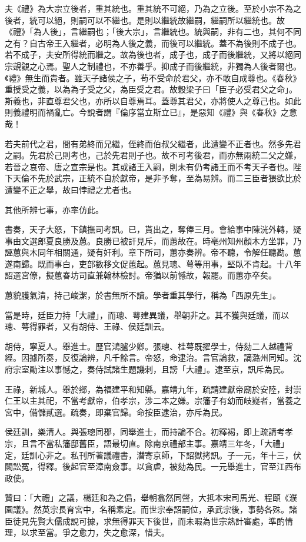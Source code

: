 \begin{pinyinscope}
夫《禮》為大宗立後者，重其統也。重其統不可絕，乃為之立後。至於小宗不為之後者，統可以絕，則嗣可以不繼也。是則以繼統故繼嗣，繼嗣所以繼統也。故《禮》「為人後」，言繼嗣也；「後大宗」，言繼統也。統與嗣，非有二也，其何不同之有？自古帝王入繼者，必明為人後之義，而後可以繼統。蓋不為後則不成子也。若不成子，夫安所得統而繼之。故為後也者，成子也，成子而後繼統，又將以絕同宗覬覦之心焉。聖人之制禮也，不亦善乎。抑成子而後繼統，非獨為人後者爾也。《禮》無生而貴者。雖天子諸侯之子，茍不受命於君父，亦不敢自成尊也。《春秋》重授受之義，以為為子受之父，為臣受之君。故穀梁子曰「臣子必受君父之命」。斯義也，非直尊君父也，亦所以自尊焉耳。蓋尊其君父，亦將使人之尊己也。如此則義禮明而禍亂亡。今說者謂『倫序當立斯立已』，是惡知《禮》與《春秋》之意哉！

若夫前代之君，間有弟終而兄繼，侄終而伯叔父繼者，此遭變不正者也。然多先君之嗣。先君於己則考也，己於先君則子也。故不可考後君，而亦無兩統二父之嫌，若晉之哀帝、唐之宣宗是也。其或諸王入嗣，則未有仍考諸王而不考天子者也。陛下天倫不先於武宗，正統不自於獻帝，是非予奪，至為易辨。而二三臣者猥欲比於遭變不正之舉，故曰悖禮之尤者也。

其他所辨七事，亦率仿此。

書奏，天子大怒，下鎮撫司考訊。已，貰出之，奪俸三月。會給事中陳洸外轉，疑事由文選郎夏良勝及蕙。良勝已被訐見斥，而蕙故在。時亳州知州顏木方坐罪，乃誣蕙與木同年相關通，疑有奸利。章下所司，蕙亦奏辨。帝不聽，令解任聽勘。蕙遂南歸。既而事白，吏部數移文促蕙起。蕙見璁、萼等用事，堅臥不肯起。十八年詔選宮僚，擬蕙春坊司直兼翰林檢討。帝猶以前憾故，報罷。而蕙亦卒矣。

蕙貌臒氣清，持己峻潔，於書無所不讀。學者重其學行，稱為「西原先生」。

當是時，廷臣力持「大禮」，而璁、萼建異議，舉朝非之。其不獲與廷議，而以璁、萼得罪者，又有胡侍、王祿、侯廷訓云。

胡侍，寧夏人。舉進士。歷官鴻臚少卿。張璁、桂萼既擢學士，侍劾二人越禮背經。因據所奏，反復論辨，凡千餘言。帝怒，命逮治。言官論救，謫潞州同知。沈府宗室勛注以事憾之，奏侍試諸生題譏刺，且謗「大禮」。逮至京，訊斥為民。

王祿，新城人。舉於鄉，為福建平和知縣。嘉靖九年，疏請建獻帝廟於安陸，封崇仁王以主其祀，不當考獻帝，伯孝宗，涉二本之嫌。宗籓子有幼而岐嶷者，當養之宮中，備儲貳選。疏奏，即棄官歸。命按臣逮治，亦斥為民。

侯廷訓，樂清人。與張璁同郡，同舉進士，而持論不合。初釋褐，即上疏請考孝宗，且言不當私籓邸舊臣，語最切直。除南京禮部主事。嘉靖三年冬，「大禮」定，廷訓心非之。私刊所著議禮書，潛寄京師，下詔獄拷訊。子一元，年十三，伏闕訟冤，得釋。後起官至漳南僉事。以貪虐，被劾為民。一元舉進士，官至江西布政使。

贊曰：「大禮」之議，楊廷和為之倡，舉朝翕然同聲，大抵本宋司馬光、程頤《濮園議》。然英宗長育宮中，名稱素定。而世宗奉詔嗣位，承武宗後，事勢各殊。諸臣徒見先賢大儒成說可據，求無得罪天下後世，而未暇為世宗熟計審處，準酌情理，以求至當。爭之愈力，失之愈深，惜夫。


\end{pinyinscope}